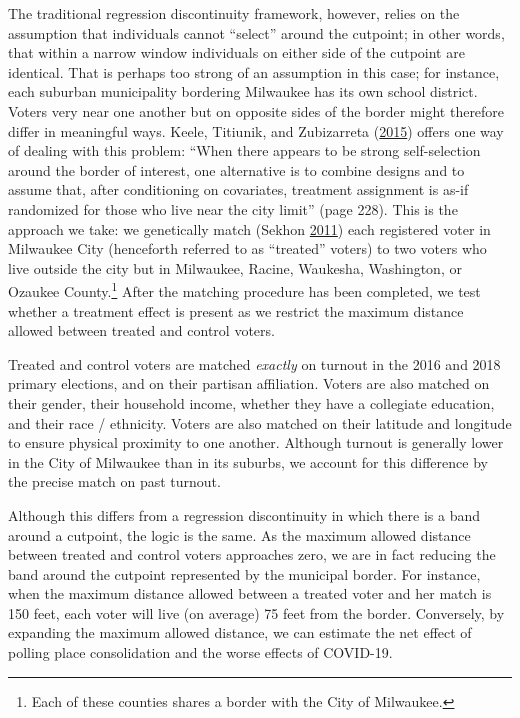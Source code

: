 \documentclass[
  12pt,
]{article}
\begin{document}
The traditional regression discontinuity framework, however, relies on the assumption that individuals cannot ``select'' around the cutpoint; in other words, that within a narrow window individuals on either side of the cutpoint are identical. That is perhaps too strong of an assumption in this case; for instance, each suburban municipality bordering Milwaukee has its own school district. Voters very near one another but on opposite sides of the border might therefore differ in meaningful ways. Keele, Titiunik, and Zubizarreta (\protect\hyperlink{ref-Keele2015}{2015}) offers one way of dealing with this problem: ``When there appears to be strong self-selection around the border of interest, one alternative is to combine designs and to assume that, after conditioning on covariates, treatment assignment is as-if randomized for those who live near the city limit'' (page 228). This is the approach we take: we genetically match (Sekhon \protect\hyperlink{ref-Sekhon2011}{2011}) each registered voter in Milwaukee City (henceforth referred to as ``treated'' voters) to two voters who live outside the city but in Milwaukee, Racine, Waukesha, Washington, or Ozaukee County.\footnote{Each of these counties shares a border with the City of Milwaukee.} After the matching procedure has been completed, we test whether a treatment effect is present as we restrict the maximum distance allowed between treated and control voters.

Treated and control voters are matched \emph{exactly} on turnout in the 2016 and 2018 primary elections, and on their partisan affiliation. Voters are also matched on their gender, their household income, whether they have a collegiate education, and their race / ethnicity. Voters are also matched on their latitude and longitude to ensure physical proximity to one another. Although turnout is generally lower in the City of Milwaukee than in its suburbs, we account for this difference by the precise match on past turnout.

Although this differs from a regression discontinuity in which there is a band around a cutpoint, the logic is the same. As the maximum allowed distance between treated and control voters approaches zero, we are in fact reducing the band around the cutpoint represented by the municipal border. For instance, when the maximum distance allowed between a treated voter and her match is 150 feet, each voter will live (on average) 75 feet from the border. Conversely, by expanding the maximum allowed distance, we can estimate the net effect of polling place consolidation and the worse effects of COVID-19.
\end{document}
